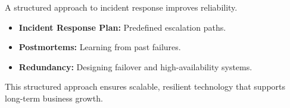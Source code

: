 A structured approach to incident response improves reliability.

\begin{itemize}
    \item \textbf{Incident Response Plan:} Predefined escalation paths.
    \item \textbf{Postmortems:} Learning from past failures.
    \item \textbf{Redundancy:} Designing failover and high-availability systems.
\end{itemize}

This structured approach ensures scalable, resilient technology that supports long-term business growth.
